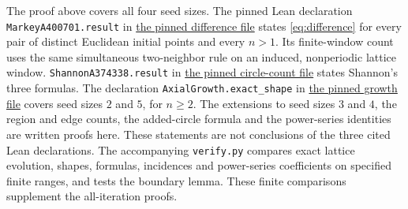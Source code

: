 \documentclass[11pt]{article}
\begin{document}
The proof above covers all four seed sizes. The pinned Lean declaration
\texttt{MarkeyA400701.result} in
\href{https://github.com/the-omega-institute/trureturing/blob/2f8421f6b90d37b4815b887f6c60987553831b20/D5/S3/StatisticalMechanics/Percolation/MarkeyFiveSiteGrowthDifference.lean}{the pinned difference file}
states \eqref{eq:difference} for every pair of distinct Euclidean initial
points and every $n>1$. Its finite-window count uses the same simultaneous
two-neighbor rule on an induced, nonperiodic lattice window.
\texttt{ShannonA374338.result} in
\href{https://github.com/the-omega-institute/trureturing/blob/2f8421f6b90d37b4815b887f6c60987553831b20/D5/S3/Geometry/ShannonFixedRadiusCircleVertices.lean}{the pinned circle-count file}
states Shannon's three formulas. The declaration
\texttt{AxialGrowth.exact\_shape} in
\href{https://github.com/the-omega-institute/trureturing/blob/2f8421f6b90d37b4815b887f6c60987553831b20/D5/S3/StatisticalMechanics/Percolation/TriangularTwoNeighborGrowth.lean}{the pinned growth file}
covers seed sizes $2$ and $5$, for $n\geq2$.
The extensions to seed sizes $3$ and $4$, the region and edge counts,
the added-circle formula and the power-series identities are written
proofs here. These statements are not conclusions of the three cited
Lean declarations. The accompanying \texttt{verify.py} compares exact
lattice evolution, shapes, formulas, incidences and power-series
coefficients on specified finite ranges, and tests the boundary lemma.
These finite comparisons supplement the all-iteration proofs.
\end{document}
